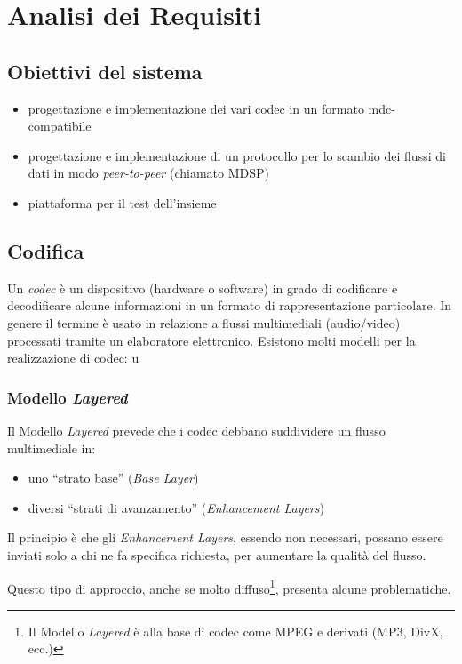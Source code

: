\chapter{Analisi dei Requisiti}

\section{Obiettivi del sistema}


\begin{itemize}
\item progettazione e implementazione dei vari codec in un formato mdc-compatibile
\item progettazione e implementazione di un protocollo per lo scambio dei
flussi di dati in modo \emph{peer-to-peer} (chiamato MDSP)
\item piattaforma per il test dell'insieme
\end{itemize}


\section{Codifica}


Un \emph{codec} è un dispositivo (hardware o software) in grado di codificare e
decodificare alcune informazioni in un formato di rappresentazione particolare.
In genere il termine è usato in relazione a flussi multimediali (audio/video)
processati tramite un elaboratore elettronico.
Esistono molti modelli per la realizzazione di codec: u


\subsection{Modello \emph{Layered}}
Il Modello \emph{Layered} prevede che i codec debbano suddividere un flusso
multimediale in:
\begin{itemize}
  \item uno ``strato base'' (\emph{Base Layer})
  \item diversi ``strati di avanzamento'' (\emph{Enhancement Layers}) 
\end{itemize}

Il principio è che gli \emph{Enhancement Layers}, essendo non necessari, possano
essere inviati solo a chi ne fa specifica richiesta, per aumentare la
qualità del flusso.

Questo tipo di approccio, anche se molto diffuso\footnote{Il Modello
\emph{Layered} è alla base di codec come MPEG e derivati (MP3, DivX, ecc.)},
presenta alcune problematiche.

